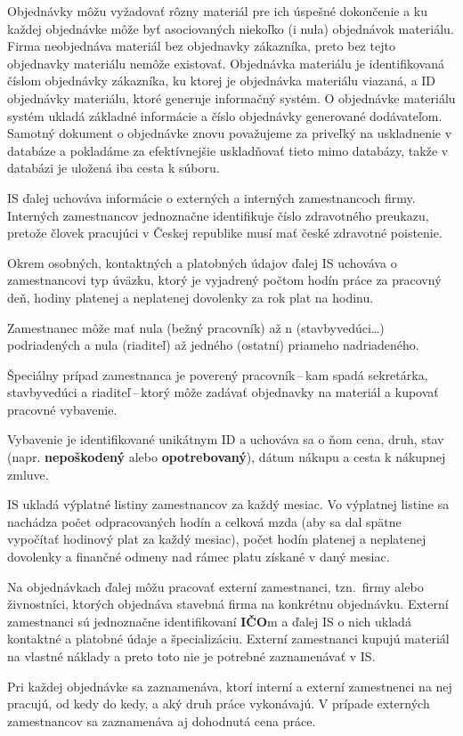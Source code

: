\documentclass[a4paper]{article}
\begin{document}
Objednávky môžu vyžadovať rôzny materiál pre ich úspešné dokončenie a ku každej objednávke môže byť asociovaných niekoľko (i nula) objednávok materiálu.
Firma neobjednáva materiál bez objednavky zákazníka, preto bez tejto objednavky materiálu nemôže existovať.
Objednávka materiálu je identifikovaná číslom objednávky zákazníka, ku ktorej je objednávka materiálu viazaná, a ID objednávky materiálu, ktoré generuje informačný systém.
O objednávke materiálu systém ukladá základné informácie a číslo objednávky generované dodávateľom.
Samotný dokument o objednávke znovu považujeme za priveľký na uskladnenie v databáze a pokladáme za efektívnejšie uskladňovať tieto mimo databázy, takže v databázi je uložená iba cesta k súboru.

IS ďalej uchováva informácie o externých a interných zamestnancoch firmy.
Interných zamestnancov jednoznačne identifikuje číslo zdravotného preukazu, pretože človek pracujúci v Českej republike musí mať české zdravotné poistenie.

Okrem osobných, kontaktných a platobných údajov ďalej IS uchováva o zamestnancovi typ úväzku, ktorý je vyjadrený počtom hodín práce za pracovný deň, hodiny platenej a neplatenej dovolenky za rok plat na hodinu.

Zamestnanec môže mať nula (bežný pracovník) až n (stavbyvedúci\dots) podriadených a nula (riaditeľ) až jedného (ostatní) priameho nadriadeného.

Špeciálny prípad zamestnanca je poverený pracovník\,--\,kam spadá sekretárka, stavbyvedúci a riaditeľ\,--\,ktorý môže zadávať objednavky na materiál a  kupovať pracovné vybavenie.

Vybavenie je identifikované unikátnym ID a uchováva sa o ňom cena, druh, stav (napr. \textbf{nepoškodený} alebo \textbf{opotrebovaný}), dátum nákupu a cesta k nákupnej zmluve.

IS ukladá výplatné listiny zamestnancov za každý mesiac. Vo výplatnej listine sa nachádza počet odpracovaných hodín a celková mzda (aby sa dal spätne vypočítať hodinový plat za každý mesiac), počet hodín platenej a neplatenej dovolenky a finančné odmeny nad rámec platu získané v daný mesiac.

Na objednávkach ďalej môžu pracovať externí zamestnanci, tzn.\ firmy alebo živnostníci, ktorých objednáva stavebná firma na konkrétnu objednávku.
Externí zamestnanci sú jednoznačne identifikovaní \textbf{IČO}m a ďalej IS o nich ukladá kontaktné a platobné údaje a špecializáciu.
Externí zamestnanci kupujú materiál na vlastné náklady a preto toto nie je potrebné zaznamenávať v IS.\@

Pri každej objednávke sa zaznamenáva, ktorí interní a externí zamestnenci na nej pracujú, od kedy do kedy, a aký druh práce vykonávajú.
V prípade externých zamestnancov sa zaznamenáva aj dohodnutá cena práce.
\end{document}
